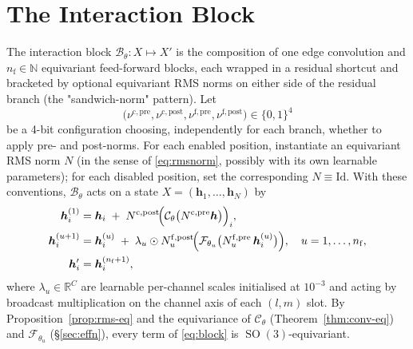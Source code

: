 \documentclass[11pt,a4paper]{article}
\DeclareMathOperator{\SO}{SO}
\newcommand{\R}{\mathbb{R}}
\newcommand{\N}{\mathbb{N}}
\newcommand{\bh}{\bm{h}}
\theoremstyle{plain}
\theoremstyle{definition}
\theoremstyle{remark}
\begin{document}
\section{The Interaction Block}\label{sec:block}

The interaction block $\mathcal{B}_\theta:X\mapsto X'$ is the composition of
one edge convolution and $n_{\mathrm{f}}\in\N$ equivariant feed-forward blocks,
each wrapped in a residual shortcut and bracketed by optional equivariant RMS
norms on either side of the residual branch (the "sandwich-norm" pattern). Let
\[
    \bigl(\nu^{\mathrm{c,pre}},\nu^{\mathrm{c,post}},\nu^{\mathrm{f,pre}},\nu^{\mathrm{f,post}}\bigr)\in\{0,1\}^{4}
\]
be a 4-bit configuration choosing, independently for each branch, whether to
apply pre- and post-norms. For each enabled position, instantiate an
equivariant RMS norm $N$ (in the sense of \eqref{eq:rmsnorm}, possibly with its
own learnable parameters); for each disabled position, set the corresponding
$N\equiv\mathrm{Id}$. With these conventions, $\mathcal{B}_\theta$ acts on a
state $X=(\bh_1,\dots,\bh_N)$ by
\begin{equation}\label{eq:block}
    \begin{aligned}
        \bh_i^{(1)}   & = \bh_i \;+\; N^{\mathrm{c,post}}\!\Bigl(\mathcal{C}_\theta\bigl(N^{\mathrm{c,pre}}\bh\bigr)\Bigr)_i,                                                                     \\
        \bh_i^{(u+1)} & = \bh_i^{(u)} \;+\; \lambda_u\odot N^{\mathrm{f,post}}_u\!\Bigl(\mathcal{F}_{\theta_u}\bigl(N^{\mathrm{f,pre}}_u\,\bh_i^{(u)}\bigr)\Bigr),\quad u=1,\dots,n_{\mathrm{f}}, \\
        \bh_i'        & = \bh_i^{(n_{\mathrm{f}}+1)},
    \end{aligned}
\end{equation}
where $\lambda_u\in\R^{C}$ are learnable per-channel scales initialised at $10^{-3}$ and acting by broadcast multiplication on the channel axis of each $(l,m)$ slot.
By Proposition~\ref{prop:rms-eq} and the equivariance of $\mathcal{C}_\theta$ (Theorem~\ref{thm:conv-eq}) and $\mathcal{F}_{\theta_u}$ (\S\ref{sec:effn}), every term of \eqref{eq:block} is $\SO(3)$-equivariant.
\end{document}
